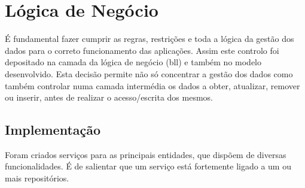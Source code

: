 %
%
\section{Lógica de Negócio}\label{sec34}

É fundamental fazer cumprir as regras, restrições e toda a lógica da gestão dos dados para o correto funcionamento das aplicações. Assim  este controlo foi depositado na camada da lógica de negócio (\acrshort{bll}) e também no modelo desenvolvido. Esta decisão permite não só concentrar a gestão dos dados como também controlar numa camada intermédia os dados a obter, atualizar, remover ou inserir, antes de realizar o acesso/escrita dos mesmos. 

\subsection{Implementação}\label{subsec341}
 
 Foram criados serviços para as principais entidades, que dispõem de diversas funcionalidades. É de salientar que um serviço está fortemente ligado a um ou mais repositórios. 